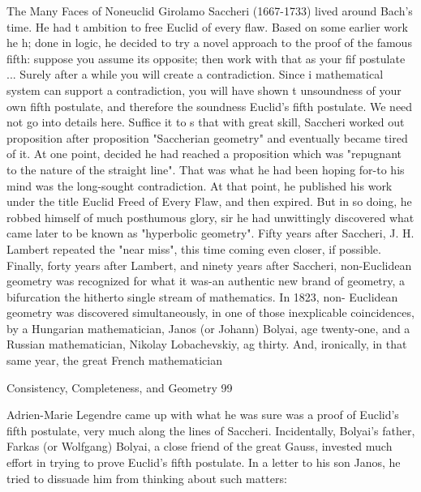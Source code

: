                           The Many Faces of Noneuclid
        Girolamo Saccheri (1667-1733) lived around Bach's time. He had t ambition to
free Euclid of every flaw. Based on some earlier work he h; done in logic, he decided to
try a novel approach to the proof of the famous fifth: suppose you assume its opposite;
then work with that as your fif postulate ... Surely after a while you will create a
contradiction. Since i mathematical system can support a contradiction, you will have
shown t unsoundness of your own fifth postulate, and therefore the soundness Euclid's
fifth postulate. We need not go into details here. Suffice it to s that with great skill,
Saccheri worked out proposition after proposition "Saccherian geometry" and eventually
became tired of it. At one point, decided he had reached a proposition which was
"repugnant to the nature of the straight line". That was what he had been hoping for-to his
mind was the long-sought contradiction. At that point, he published his work under the
title Euclid Freed of Every Flaw, and then expired.
        But in so doing, he robbed himself of much posthumous glory, sir he had
unwittingly discovered what came later to be known as "hyperbolic geometry". Fifty
years after Saccheri, J. H. Lambert repeated the "near miss", this time coming even
closer, if possible. Finally, forty years after Lambert, and ninety years after Saccheri,
non-Euclidean geometry was recognized for what it was-an authentic new brand of
geometry, a bifurcation the hitherto single stream of mathematics. In 1823, non-
Euclidean geometry was discovered simultaneously, in one of those inexplicable
coincidences, by a Hungarian mathematician, Janos (or Johann) Bolyai, age twenty-one,
and a Russian mathematician, Nikolay Lobachevskiy, ag thirty. And, ironically, in that
same year, the great French mathematician




Consistency, Completeness, and Geometry                                                    99

Adrien-Marie Legendre came up with what he was sure was a proof of Euclid's fifth
postulate, very much along the lines of Saccheri.
        Incidentally, Bolyai's father, Farkas (or Wolfgang) Bolyai, a close friend of the
great Gauss, invested much effort in trying to prove Euclid's fifth postulate. In a letter to
his son Janos, he tried to dissuade him from thinking about such matters:

